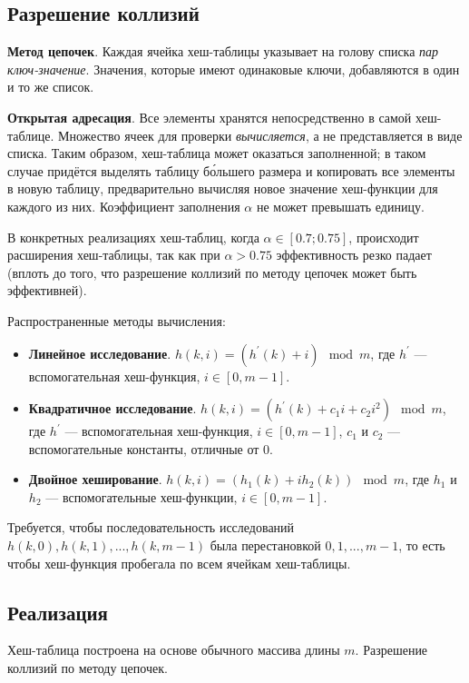 \subsection{Разрешение коллизий}
\textbf{Метод цепочек}. Каждая ячейка хеш-таблицы указывает на голову списка \emph{пар ключ-значение}. Значения, которые имеют одинаковые ключи, добавляются в один и то же список.

\textbf{Открытая адресация}. Все элементы хранятся непосредственно в самой хеш-таблице. Множество ячеек для проверки \emph{вычисляется}, а не представляется в виде списка. Таким образом, хеш-таблица может оказаться заполненной; в таком случае придётся выделять таблицу б\'{о}льшего размера и копировать все элементы в новую таблицу, предварительно вычисляя новое значение хеш-функции для каждого из них. Коэффициент заполнения $\alpha$ не может превышать единицу.

В конкретных реализациях хеш-таблиц, когда $\alpha \in [0.7; 0.75]$, происходит расширения хеш-таблицы, так как при $\alpha > 0.75$ эффективность резко падает (вплоть до того, что разрешение коллизий по методу цепочек может быть эффективней).

Распространенные методы вычисления:

\begin{itemize}
  \item \textbf{Линейное исследование}. $h(k, i) = (h^{'}(k) + i) \mod m$, где $h^{'}$ --- вспомогательная хеш-функция, $i \in [0, m -1 ]$.
  \item \textbf{Квадратичное исследование}. $h(k, i) = (h^{'}(k) + c_1i + c_2i^2) \mod m$, где $h^{'}$ --- вспомогательная хеш-функция, $i \in [0, m -1 ]$, $c_1$ и $c_2$ --- вспомогательные константы, отличные от $0$.
  \item \textbf{Двойное хеширование}. $h(k, i) = (h_1(k) + ih_2(k)) \mod m$, где $h_1$ и $h_2$ --- вспомогательные хеш-функции, $i \in [0, m -1 ]$.
\end{itemize}

Требуется, чтобы последовательность исследований $h(k, 0), h(k, 1), ..., h(k, m - 1)$ была перестановкой $0, 1, ..., m - 1$, то есть чтобы хеш-функция пробегала по всем ячейкам хеш-таблицы.

\subsection{Реализация}
Хеш-таблица построена на основе обычного массива длины $m$. Разрешение коллизий по методу цепочек.

